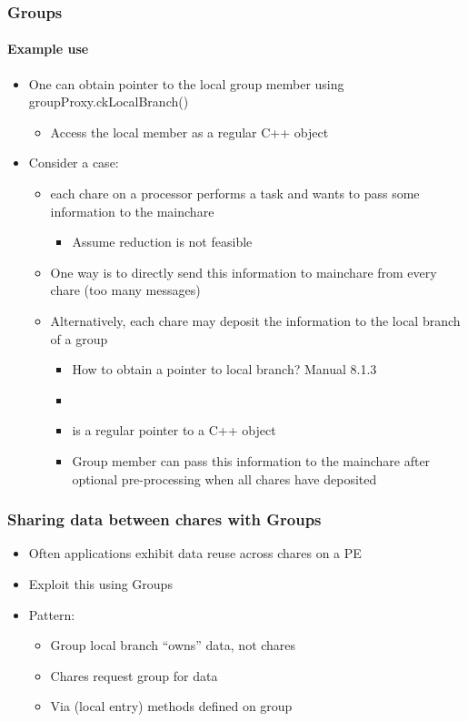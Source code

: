 \begin{frame}[fragile]
  \frametitle{Groups}
  \framesubtitle{Example use}
  \begin{itemize}
    \item  One can obtain pointer to the local group member using groupProxy.ckLocalBranch()
    \begin{itemize}
      \item Access the local member as a regular C++ object
    \end{itemize}
   \item Consider a case:
   \begin{itemize}
      \item each chare on a processor performs a task and wants to pass some information to the mainchare
      \begin{itemize}
         \item Assume reduction is not feasible
      \end{itemize}
      \item One way is to directly send this information to mainchare from every chare (too many messages)
      \item Alternatively, each chare may deposit the information to the local branch of a group
      \begin{itemize}
        \item How to obtain a pointer to local branch? Manual 8.1.3
        \item {}
        \item {} is a regular pointer to a C++ object
        \item Group member can pass this information to the mainchare after optional pre-processing when all chares have deposited 
      \end{itemize}
    \end{itemize}
  \end{itemize}
\end{frame}

\begin{frame}[fragile]
  \frametitle{Sharing data between chares with Groups}
  \begin{itemize}
  \item Often applications exhibit data reuse across chares on a PE
  \item Exploit this using Groups
  \item Pattern:
    \begin{itemize}
    \item Group local branch ``owns'' data, not chares
    \item Chares request group for data
    \item Via (local entry) methods defined on group
    \end{itemize}
  \end{itemize}
\end{frame}

